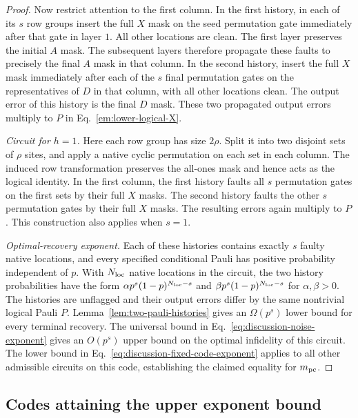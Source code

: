 \documentclass[aps,prl,reprint,notitlepage,nofootinbib,nobibnotes]{revtex4-2}
\begin{document}
\begin{proof}
Now restrict attention to the first column. In the first history, in each of its \(s\) row groups insert the full \(X\) mask on the seed permutation gate immediately after that gate in layer \(1\). All other locations are clean. The first layer preserves the initial \(A\) mask. The subsequent layers therefore propagate these faults to precisely the final \(A\) mask in that column. In the second history, insert the full \(X\) mask immediately after each of the \(s\) final permutation gates on the representatives of \(D\) in that column, with all other locations clean. The output error of this history is the final \(D\) mask. These two propagated output errors multiply to \(P\) in Eq.~\eqref{em:lower-logical-X}.

\emph{Circuit for \(h=1\).}
Here each row group has size \(2\rho\). Split it into two disjoint sets of \(\rho\) sites, and apply a native cyclic permutation on each set in each column. The induced row transformation preserves the all-ones mask and hence acts as the logical identity. In the first column, the first history faults all \(s\) permutation gates on the first sets by their full \(X\) masks. The second history faults the other \(s\) permutation gates by their full \(X\) masks. The resulting errors again multiply to \(P\). This construction also applies when \(s=1\).

\emph{Optimal-recovery exponent.}
Each of these histories contains exactly \(s\) faulty native locations, and every specified conditional Pauli has positive probability independent of \(p\). With \(N_{\rm loc}\) native locations in the circuit, the two history probabilities have the form \(\alpha p^s(1-p)^{N_{\rm loc}-s}\) and \(\beta p^s(1-p)^{N_{\rm loc}-s}\) for \(\alpha,\beta>0\). The histories are unflagged and their output errors differ by the same nontrivial logical Pauli \(P\). Lemma~\ref{lem:two-pauli-histories} gives an \(\Omega(p^s)\) lower bound for every terminal recovery. The universal bound in Eq.~\eqref{eq:discussion-noise-exponent} gives an \(O(p^s)\) upper bound on the optimal infidelity of this circuit. The lower bound in Eq.~\eqref{eq:discussion-fixed-code-exponent} applies to all other admissible circuits on this code, establishing the claimed equality for \(m_{\rm pc}\).
\end{proof}


\subsection*{Codes attaining the upper exponent bound}
\label{em:upper-saturation}
\end{document}
